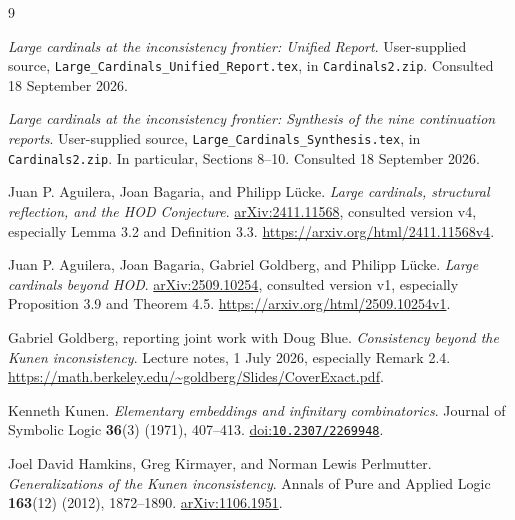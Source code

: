 \documentclass[11pt,letterpaper]{article}
\theoremstyle{definition}
\newcommand{\arxiv}[1]{\href{https://arxiv.org/abs/#1}{arXiv:#1}}
\newcommand{\doi}[1]{\href{https://doi.org/#1}{doi:\nolinkurl{#1}}}
\numberwithin{equation}{section}
\begin{document}
\begin{thebibliography}{9}
\raggedright
{}

\emph{Large cardinals at the inconsistency frontier: Unified Report}.
User-supplied source, \texttt{Large\_Cardinals\_Unified\_Report.tex}, in \texttt{Cardinals2.zip}. Consulted 18 September 2026.

\emph{Large cardinals at the inconsistency frontier: Synthesis of the nine continuation reports}.
User-supplied source, \texttt{Large\_Cardinals\_Synthesis.tex}, in \texttt{Cardinals2.zip}. In particular, Sections 8--10. Consulted 18 September 2026.

Juan P. Aguilera, Joan Bagaria, and Philipp L\"ucke.
\emph{Large cardinals, structural reflection, and the HOD Conjecture}.
\arxiv{2411.11568}, consulted version v4, especially Lemma 3.2 and Definition 3.3.
\url{https://arxiv.org/html/2411.11568v4}.

Juan P. Aguilera, Joan Bagaria, Gabriel Goldberg, and Philipp L\"ucke.
\emph{Large cardinals beyond HOD}.
\arxiv{2509.10254}, consulted version v1, especially Proposition 3.9 and Theorem 4.5.
\url{https://arxiv.org/html/2509.10254v1}.

Gabriel Goldberg, reporting joint work with Doug Blue.
\emph{Consistency beyond the Kunen inconsistency}.
Lecture notes, 1 July 2026, especially Remark 2.4.
\url{https://math.berkeley.edu/~goldberg/Slides/CoverExact.pdf}.

Kenneth Kunen.
\emph{Elementary embeddings and infinitary combinatorics}.
Journal of Symbolic Logic \textbf{36}(3) (1971), 407--413.
\doi{10.2307/2269948}.

Joel David Hamkins, Greg Kirmayer, and Norman Lewis Perlmutter.
\emph{Generalizations of the Kunen inconsistency}.
Annals of Pure and Applied Logic \textbf{163}(12) (2012), 1872--1890.
\arxiv{1106.1951}.

\end{thebibliography}
\end{document}

